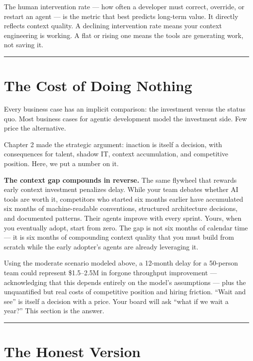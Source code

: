\documentclass[
  a4paper,
  DIV=11,
  numbers=noendperiod]{scrreprt}
\begin{document}
The human intervention rate --- how often a developer must correct,
override, or restart an agent --- is the metric that best predicts
long-term value. It directly reflects context quality. A declining
intervention rate means your context engineering is working. A flat or
rising one means the tools are generating work, not saving it.

\begin{center}\rule{0.5\linewidth}{0.5pt}\end{center}

\section{The Cost of Doing Nothing}\label{the-cost-of-doing-nothing}

Every business case has an implicit comparison: the investment versus
the status quo. Most business cases for agentic development model the
investment side. Few price the alternative.

Chapter 2 made the strategic argument: inaction is itself a decision,
with consequences for talent, shadow IT, context accumulation, and
competitive position. Here, we put a number on it.

\textbf{The context gap compounds in reverse.} The same flywheel that
rewards early context investment penalizes delay. While your team
debates whether AI tools are worth it, competitors who started six
months earlier have accumulated six months of machine-readable
conventions, structured architecture decisions, and documented patterns.
Their agents improve with every sprint. Yours, when you eventually
adopt, start from zero. The gap is not six months of calendar time ---
it is six months of compounding context quality that you must build from
scratch while the early adopter's agents are already leveraging it.

Using the moderate scenario modeled above, a 12-month delay for a
50-person team could represent \$1.5--2.5M in forgone throughput
improvement --- acknowledging that this depends entirely on the model's
assumptions --- plus the unquantified but real costs of competitive
position and hiring friction. ``Wait and see'' is itself a decision with
a price. Your board will ask ``what if we wait a year?'' This section is
the answer.

\begin{center}\rule{0.5\linewidth}{0.5pt}\end{center}

\section{The Honest Version}\label{the-honest-version}
\end{document}

